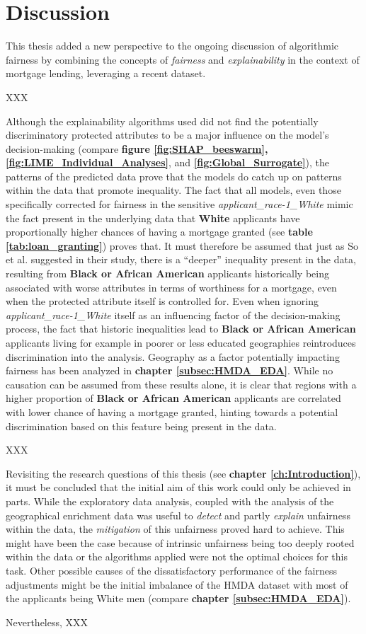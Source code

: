 \chapter{Discussion}\label{ch:discussion}

This thesis added a new perspective to the ongoing discussion of algorithmic fairness by combining the concepts of \textit{fairness} and \textit{explainability} in the context of mortgage lending, leveraging a recent dataset.

XXX

Although the explainability algorithms used did not find the potentially discriminatory protected attributes to be a major influence on the model’s decision-making (compare \textbf{figure \ref{fig:SHAP_beeswarm}, \ref{fig:LIME_Individual_Analyses}}, and \textbf{\ref{fig:Global_Surrogate}}), the patterns of the predicted data prove that the models do catch up on patterns within the data that promote inequality. 
The fact that all models, even those specifically corrected for fairness in the sensitive \textit{applicant\_race-1\_White} mimic the fact present in the underlying data that \textbf{White} applicants have proportionally higher chances of having a mortgage granted (see \textbf{table \ref{tab:loan_granting}}) proves that. 
It must therefore be assumed that just as So et al. \parencite{So2022} suggested in their study, there is a “deeper” inequality present in the data, resulting from \textbf{Black or African American} applicants historically being associated with worse attributes in terms of worthiness for a mortgage, even when the protected attribute itself is controlled for.
Even when ignoring \textit{applicant\_race-1\_White} itself as an influencing factor of the decision-making process, the fact that historic inequalities lead to \textbf{Black or African American} applicants living for example in poorer or less educated geographies reintroduces discrimination into the analysis.
Geography as a factor potentially impacting fairness has been analyzed in \textbf{chapter \ref{subsec:HMDA_EDA}}. While no causation can be assumed from these results alone, it is clear that regions with a higher proportion of \textbf{Black or African American} applicants are correlated with lower chance of having a mortgage granted, hinting towards a potential discrimination based on this feature being present in the data.

XXX

Revisiting the research questions of this thesis (see \textbf{chapter \ref{ch:Introduction}}), it must be concluded that the initial aim of this work could only be achieved in parts. 
While the exploratory data analysis, coupled with the analysis of the geographical enrichment data was useful to \textit{detect} and partly \textit{explain} unfairness within the data, the \textit{mitigation} of this unfairness proved hard to achieve. 
This might have been the case because of intrinsic unfairness being too deeply rooted within the data or the algorithms applied were not the optimal choices for this task.
Other possible causes of the dissatisfactory performance of the fairness adjustments might be the initial imbalance of the HMDA dataset with most of the applicants being White men (compare \textbf{chapter \ref{subsec:HMDA_EDA}}).

Nevertheless, XXX